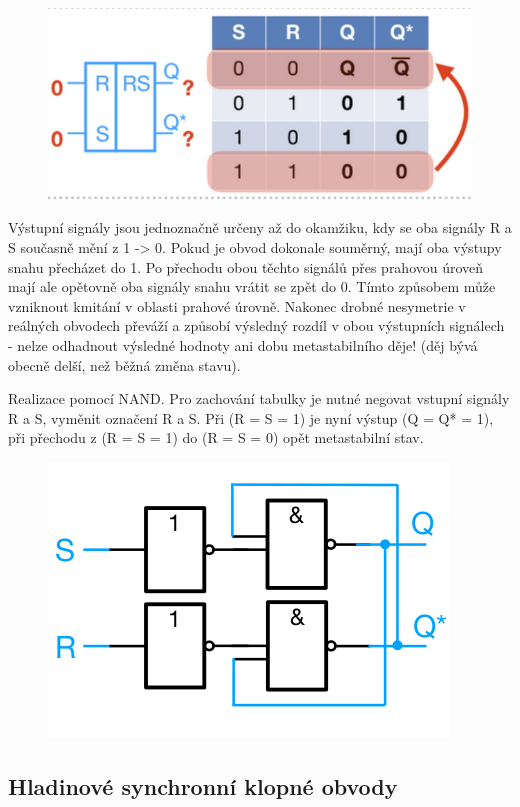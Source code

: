 \begin{figure}[h!]
    \centering
    \includegraphics*[scale = 0.4]{img/RSMeta.png}
\end{figure}
Výstupní signály jsou jednoznačně určeny až do okamžiku, kdy se oba signály R a S současně mění z 1 -> 0. Pokud je obvod dokonale souměrný, mají oba výstupy snahu přecházet do 1. Po přechodu obou těchto signálů přes prahovou úroveň mají ale opětovně oba signály snahu vrátit se zpět do 0. Tímto způsobem může vzniknout kmitání v oblasti prahové úrovně. Nakonec drobné nesymetrie v reálných obvodech převáží a způsobí výsledný rozdíl v obou výstupních signálech - nelze odhadnout výsledné hodnoty ani dobu metastabilního děje! (děj bývá obecně delší, než běžná změna stavu).

Realizace pomocí NAND. Pro zachování tabulky je nutné negovat vstupní signály R a S, vyměnit označení R a S. Při (R = S = 1) je nyní výstup (Q = Q* = 1), při přechodu z (R = S = 1) do (R = S = 0) opět metastabilní stav.

\begin{figure}[h!]
    \centering
    \includegraphics*[scale = 0.5]{img/RSNAND.png}
\end{figure}

\subsection{Hladinové synchronní klopné obvody}
